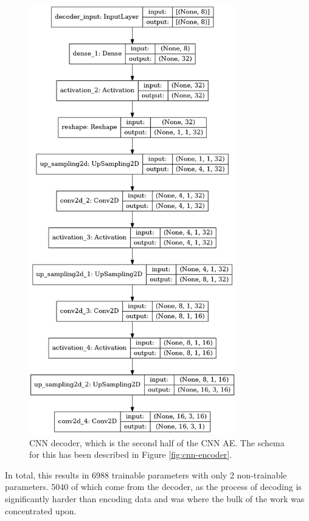 \documentclass[a4paper]{article}
\theoremstyle{plain}
\theoremstyle{definition}
\begin{document}
\begin{figure}[H]
\begin{minipage}[c]{0.45\linewidth}
						\includegraphics[width=0.8\textwidth]{decoder.png}
						\caption{CNN decoder, which is the second half of the CNN AE. The schema for this has been described in Figure \ref{fig:cnn-encoder}.}
						\label{fig:cnn-decoder}
					\end{minipage}
			\end{figure}

			In total, this results in 6988 trainable parameters with only 2 non-trainable parameters. 5040 of which come from the decoder, as the process of decoding is significantly harder than encoding data and was where the bulk of the work was concentrated upon. 
\end{document}
